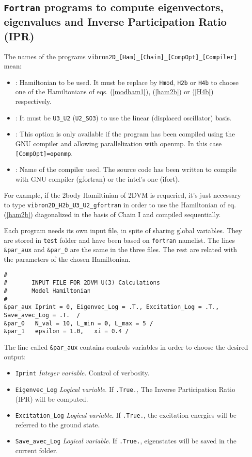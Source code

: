 \documentclass[a4paper,12pt,captions=tableheading]{article}
\begin{document}
\subsection{\texttt{Fortran} programs to compute eigenvectors, eigenvalues and Inverse Participation Ratio (IPR)}
\label{sec-3-1}

The names of the programs \texttt{vibron2D\_[Ham]\_[Chain]\_[CompOpt]\_[Compiler]} mean:
\begin{itemize}
\item\relax [Ham]: Hamiltonian to be used. It must be replace by \texttt{Hmod}, \texttt{H2b} or \texttt{H4b} to choose one of the Hamiltonians of eqs. (\ref{modham1}), (\ref{ham2b}) or (\ref{H4b}) respectively.
\item\relax [Chain]: It must be \texttt{U3\_U2} (\texttt{U2\_SO3}) to use the linear (displaced oscillator) basis.
\item\relax [CompOpt]: This option is only available if the program has been compiled using the GNU compiler and allowing parallelization with openmp. In this case \texttt{[CompOpt]=openmp}.
\item\relax [Compiler]: Name of the compiler used. The source code has been written to  compile with GNU compiler (gfortran) or the intel's one (ifort).
\end{itemize}


For example, if the 2body Hamiltinian of 2DVM  is requeried, it's just necessary to type \texttt{vibron2D\_H2b\_U3\_U2\_gfortran} in order to use the Hamiltonian of eq. (\ref{ham2b}) diagonalized in the basis of Chain I and compiled sequentially.

Each program needs its own input file, in spite of sharing global variables. They are stored in \verb~test~ folder and have been based on \texttt{fortran} namelist. The lines \texttt{\&par\_aux} and \texttt{\&par\_0} are the same in the three files. The rest are related with the parameters of the chosen Hamiltonian.

\begin{verbatim}
#
#       INPUT FILE FOR 2DVM U(3) Calculations
#       Model Hamiltonian
#
&par_aux Iprint = 0, Eigenvec_Log = .T., Excitation_Log = .T., Save_avec_Log = .T.  /
&par_0   N_val = 10, L_min = 0, L_max = 5 /
&par_1   epsilon = 1.0,   xi = 0.4 /
\end{verbatim}

The line called \texttt{\&par\_aux} contains controls variables in order to choose the desired output:

\begin{itemize}
\item \verb~Iprint~ \emph{Integer variable}. Control of verbosity.
\item \verb~Eigenvec_Log~ \emph{Logical variable}.  If \verb~.True.~, The Inverse Participation Ratio (IPR) will be computed.
\item \verb~Excitation_Log~ \emph{Logical variable}. If \verb~.True.~, the excitation energies will be referred to the ground state.
\item \verb~Save_avec_Log~ \emph{Logical variable}. If \verb~.True.~, eigenstates will be saved in the current folder.
\end{itemize}
\end{document}
